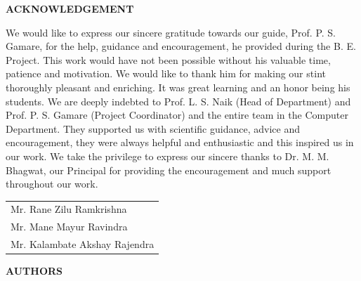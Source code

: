 \documentclass[a4paper,12pt]{report}
\def\baselinestretch{1.5}
\begin{document}
\begin{center}
{\huge \bf {ACKNOWLEDGEMENT}}
\end{center}
\vspace{10mm}
\hspace*{\parindent}We would like to express our sincere gratitude towards our guide, Prof. P. S. Gamare, for the help, guidance and encouragement, he provided during the B. E. Project. This work would have not been possible without his valuable time, patience and motivation. We would like to thank him for making our stint thoroughly pleasant and enriching. It was great learning and an honor being his students. We are deeply indebted to Prof. L. S. Naik (Head of Department) and Prof. P. S. Gamare (Project Coordinator) and the entire team in the Computer Department. They supported us with scientific guidance, advice and encouragement, they were always helpful and enthusiastic and this inspired us in our work. We take the privilege to express our sincere thanks to Dr. M. M. Bhagwat, our Principal for providing the encouragement and much support throughout our work.
\vfill
\begin{flushright}
\begin{tabular}{p{60mm}}
\vspace{5mm}
{ {Mr. Rane Zilu Ramkrishna}}\\
\vspace{5mm}
{ {Mr. Mane Mayur Ravindra}}\\
\vspace{5mm}
{ {Mr. Kalambate Akshay Rajendra}}
\end{tabular}
\end{flushright}
\vfill
\newpage
\begin{center}
{\huge \bf {AUTHORS}}\\
\end{center}
\vspace{10mm}
\def\baselinestretch{1}
\begin{framed}
\centering
{}
\end{framed}
\end{document}
